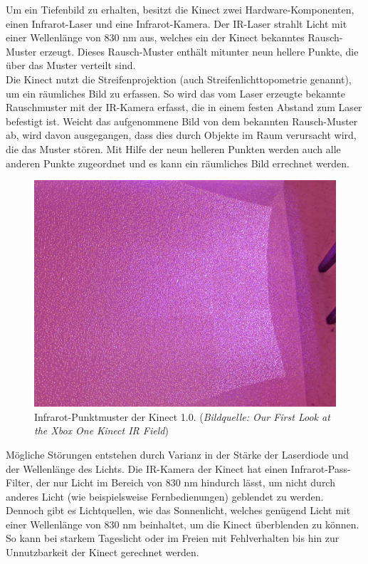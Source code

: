 \documentclass[12pt,a4paper,ngerman]{scrartcl}
\begin{document}
Um ein Tiefenbild zu erhalten, besitzt die Kinect zwei Hardware-Komponenten, einen
Infrarot-Laser und eine Infrarot-Kamera. Der IR-Laser strahlt Licht mit einer Wellenlänge
von 830 nm aus, welches ein der Kinect bekanntes Rausch-Muster erzeugt. Dieses Rausch-Muster enthält
mitunter neun hellere Punkte, die über das Muster verteilt sind.\\
Die Kinect nutzt die Streifenprojektion (auch Streifenlichttopometrie genannt), um ein
räumliches Bild zu erfassen. So wird das vom Laser erzeugte bekannte Rauschmuster mit der IR-Kamera erfasst, die in einem festen Abstand zum Laser befestigt ist. Weicht das aufgenommene
Bild von dem bekannten Rausch-Muster ab, wird davon ausgegangen, dass dies durch
Objekte im Raum verursacht wird, die das Muster stören. Mit Hilfe der neun helleren Punkten werden
auch alle anderen Punkte zugeordnet und es kann ein räumliches Bild errechnet werden.

\begin{figure}[H]
    \centering
    \includegraphics[scale=0.33]{img/kinect_infrared.jpg}
    \caption{Infrarot-Punktmuster der Kinect 1.0. ({\em Bildquelle: Our First Look at the Xbox One Kinect IR Field\cite{kinect2:infrared}})}
\end{figure}

Mögliche Störungen entstehen durch Varianz in der Stärke der Laserdiode und der Wellenlänge des Lichts.
Die IR-Kamera der Kinect hat einen Infrarot-Pass-Filter, der nur Licht im Bereich von 830 nm
hindurch lässt, um nicht durch anderes Licht (wie beispielsweise Fernbedienungen) geblendet zu
werden. Dennoch gibt es Lichtquellen, wie das Sonnenlicht, welches genügend Licht mit einer
Wellenlänge von 830 nm  beinhaltet, um die Kinect überblenden zu können. So kann bei starkem
Tageslicht oder im Freien mit Fehlverhalten bis hin zur Unnutzbarkeit der Kinect gerechnet werden.
\end{document}
